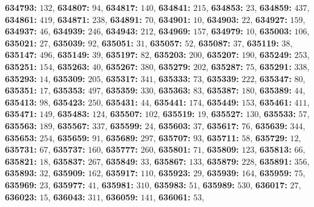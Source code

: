 \textsf{\bfseries 634793:} $132$, \textsf{\bfseries 634807:} $94$, \textsf{\bfseries 634817:} $140$, \textsf{\bfseries 634841:} $215$, \textsf{\bfseries 634853:} $23$, \textsf{\bfseries 634859:} $437$, \textsf{\bfseries 634861:} $419$, \textsf{\bfseries 634871:} $238$, \textsf{\bfseries 634891:} $70$, \textsf{\bfseries 634901:} $10$, \textsf{\bfseries 634903:} $22$, \textsf{\bfseries 634927:} $159$, \textsf{\bfseries 634937:} $46$, \textsf{\bfseries 634939:} $246$, \textsf{\bfseries 634943:} $212$, \textsf{\bfseries 634969:} $157$, \textsf{\bfseries 634979:} $10$, \textsf{\bfseries 635003:} $106$, \textsf{\bfseries 635021:} $27$, \textsf{\bfseries 635039:} $92$, \textsf{\bfseries 635051:} $31$, \textsf{\bfseries 635057:} $52$, \textsf{\bfseries 635087:} $37$, \textsf{\bfseries 635119:} $38$, \textsf{\bfseries 635147:} $496$, \textsf{\bfseries 635149:} $39$, \textsf{\bfseries 635197:} $82$, \textsf{\bfseries 635203:} $200$, \textsf{\bfseries 635207:} $190$, \textsf{\bfseries 635249:} $253$, \textsf{\bfseries 635251:} $154$, \textsf{\bfseries 635263:} $40$, \textsf{\bfseries 635267:} $380$, \textsf{\bfseries 635279:} $202$, \textsf{\bfseries 635287:} $75$, \textsf{\bfseries 635291:} $338$, \textsf{\bfseries 635293:} $14$, \textsf{\bfseries 635309:} $205$, \textsf{\bfseries 635317:} $341$, \textsf{\bfseries 635333:} $73$, \textsf{\bfseries 635339:} $222$, \textsf{\bfseries 635347:} $80$, \textsf{\bfseries 635351:} $17$, \textsf{\bfseries 635353:} $497$, \textsf{\bfseries 635359:} $330$, \textsf{\bfseries 635363:} $83$, \textsf{\bfseries 635387:} $180$, \textsf{\bfseries 635389:} $44$, \textsf{\bfseries 635413:} $98$, \textsf{\bfseries 635423:} $250$, \textsf{\bfseries 635431:} $44$, \textsf{\bfseries 635441:} $174$, \textsf{\bfseries 635449:} $153$, \textsf{\bfseries 635461:} $411$, \textsf{\bfseries 635471:} $149$, \textsf{\bfseries 635483:} $124$, \textsf{\bfseries 635507:} $102$, \textsf{\bfseries 635519:} $19$, \textsf{\bfseries 635527:} $130$, \textsf{\bfseries 635533:} $57$, \textsf{\bfseries 635563:} $189$, \textsf{\bfseries 635567:} $337$, \textsf{\bfseries 635599:} $24$, \textsf{\bfseries 635603:} $37$, \textsf{\bfseries 635617:} $76$, \textsf{\bfseries 635639:} $344$, \textsf{\bfseries 635653:} $254$, \textsf{\bfseries 635659:} $91$, \textsf{\bfseries 635689:} $297$, \textsf{\bfseries 635707:} $93$, \textsf{\bfseries 635711:} $58$, \textsf{\bfseries 635729:} $12$, \textsf{\bfseries 635731:} $67$, \textsf{\bfseries 635737:} $160$, \textsf{\bfseries 635777:} $260$, \textsf{\bfseries 635801:} $71$, \textsf{\bfseries 635809:} $123$, \textsf{\bfseries 635813:} $66$, \textsf{\bfseries 635821:} $18$, \textsf{\bfseries 635837:} $267$, \textsf{\bfseries 635849:} $33$, \textsf{\bfseries 635867:} $133$, \textsf{\bfseries 635879:} $228$, \textsf{\bfseries 635891:} $356$, \textsf{\bfseries 635893:} $32$, \textsf{\bfseries 635909:} $162$, \textsf{\bfseries 635917:} $110$, \textsf{\bfseries 635923:} $29$, \textsf{\bfseries 635939:} $164$, \textsf{\bfseries 635959:} $75$, \textsf{\bfseries 635969:} $23$, \textsf{\bfseries 635977:} $41$, \textsf{\bfseries 635981:} $310$, \textsf{\bfseries 635983:} $51$, \textsf{\bfseries 635989:} $530$, \textsf{\bfseries 636017:} $27$, \textsf{\bfseries 636023:} $15$, \textsf{\bfseries 636043:} $311$, \textsf{\bfseries 636059:} $141$, \textsf{\bfseries 636061:} $53$, 
